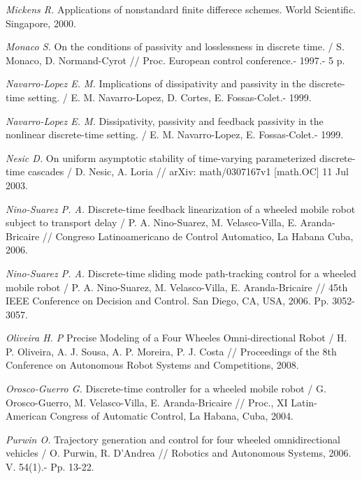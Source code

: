 \begin{thebibliography}{10}
	
	{\it Mickens R.} Applications of nonstandard finite differece schemes. World Scientific. Singapore, 2000.
	
	{\it Monaco S.} On the conditions of passivity and losslessness in discrete time. / S. Monaco, D. Normand-Cyrot // Proc. European control conference.- 1997.- 5 p.
	
	{\it Navarro-Lopez E. M.} Implications of dissipativity and passivity in the discrete-time setting. / E. M. Navarro-Lopez, D. Cortes, E. Fossas-Colet.- 1999.
	
	{\it Navarro-Lopez E. M.} Dissipativity, passivity and feedback passivity in the nonlinear discrete-time setting. / E. M. Navarro-Lopez, E. Fossas-Colet.- 1999.
	
	{\it Nesic D.} On uniform asymptotic stability of time-varying parameterized discrete-time cascades / D. Nesic, A. Loria // arXiv: math/0307167v1 [math.OC] 11 Jul 2003.
	
	{\it Nino-Suarez P. A.} Discrete-time feedback linearization of a wheeled mobile robot subject to transport delay / P. A.  Nino-Suarez, M. Velasco-Villa, E. Aranda-Bricaire // Congreso Latinoamericano de Control Automatico, La Habana Cuba, 2006.
	
	{\it Nino-Suarez P. A.} Discrete-time sliding mode path-tracking control for a wheeled mobile robot / P. A.  Nino-Suarez, M. Velasco-Villa, E. Aranda-Bricaire // 45th IEEE Conference on Decision and Control. San Diego, CA, USA, 2006. Pp. 3052-3057.
	
	{\it Oliveira H. P} Precise Modeling of a Four Wheeles Omni-directional Robot / H. P. Oliveira, A. J. Sousa, A. P. Moreira, P. J. Costa // Proceedings of the 8th Conference on Autonomous Robot Systems and Competitions, 2008.
	
	{\it Orosco-Guerro G.} Discrete-time controller for a wheeled mobile robot / G. Orosco-Guerro, M. Velasco-Villa, E. Aranda-Bricaire // Proc., XI Latin-American Congress of Automatic Control, La Habana, Cuba, 2004.
	
	
	{\it Purwin O.} Trajectory generation and control for four wheeled omnidirectional vehicles / O. Purwin, R. D'Andrea // Robotics and Autonomous Systems, 2006. V. 54(1).- Pp. 13-22.
	

\end{thebibliography}
